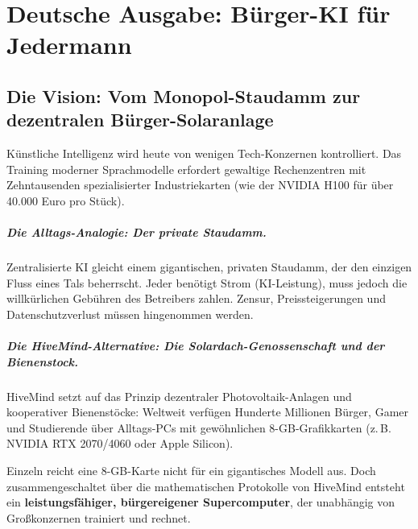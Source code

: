 \documentclass[11pt,a4paper]{report}
\begin{document}
\newpage

\chapter{Deutsche Ausgabe: Bürger-KI für Jedermann}
\label{chap:de}

\section{Die Vision: Vom Monopol-Staudamm zur dezentralen Bürger-Solaranlage}

Künstliche Intelligenz wird heute von wenigen Tech-Konzernen kontrolliert. Das Training moderner Sprachmodelle erfordert gewaltige Rechenzentren mit Zehntausenden spezialisierter Industriekarten (wie der NVIDIA H100 für über 40.000 Euro pro Stück).

\paragraph{Die Alltags-Analogie: Der private Staudamm.}
Zentralisierte KI gleicht einem gigantischen, privaten Staudamm, der den einzigen Fluss eines Tals beherrscht. Jeder benötigt Strom (KI-Leistung), muss jedoch die willkürlichen Gebühren des Betreibers zahlen. Zensur, Preissteigerungen und Datenschutzverlust müssen hingenommen werden.

\paragraph{Die HiveMind-Alternative: Die Solardach-Genossenschaft und der Bienenstock.}
HiveMind setzt auf das Prinzip dezentraler Photovoltaik-Anlagen und kooperativer Bienenstöcke:
Weltweit verfügen Hunderte Millionen Bürger, Gamer und Studierende über Alltags-PCs mit gewöhnlichen 8-GB-Grafikkarten (z.\,B. NVIDIA RTX 2070/4060 oder Apple Silicon). 

Einzeln reicht eine 8-GB-Karte nicht für ein gigantisches Modell aus. Doch zusammengeschaltet über die mathematischen Protokolle von HiveMind entsteht ein \textbf{leistungsfähiger, bürgereigener Supercomputer}, der unabhängig von Großkonzernen trainiert und rechnet.
\end{document}
